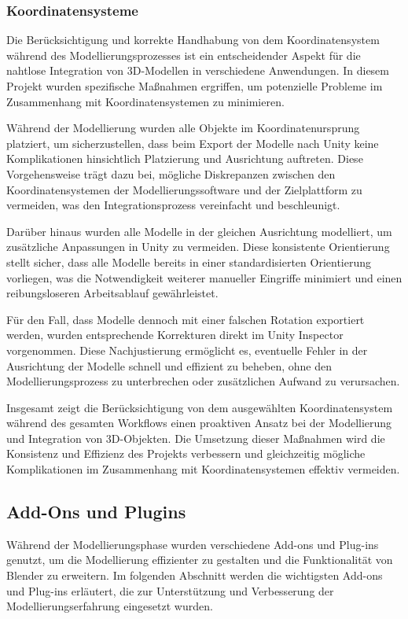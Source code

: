 \subsubsection{Koordinatensysteme}
Die Berücksichtigung und korrekte Handhabung von dem Koordinatensystem während des Modellierungsprozesses ist ein entscheidender Aspekt für die nahtlose Integration von 3D-Modellen in verschiedene Anwendungen. In diesem Projekt wurden spezifische Maßnahmen ergriffen, um potenzielle Probleme im Zusammenhang mit Koordinatensystemen zu minimieren.

Während der Modellierung wurden alle Objekte im Koordinatenursprung platziert, um sicherzustellen, dass beim Export der Modelle nach Unity keine Komplikationen hinsichtlich Platzierung und Ausrichtung auftreten. Diese Vorgehensweise trägt dazu bei, mögliche Diskrepanzen zwischen den Koordinatensystemen der Modellierungssoftware und der Zielplattform zu vermeiden, was den Integrationsprozess vereinfacht und beschleunigt.

Darüber hinaus wurden alle Modelle in der gleichen Ausrichtung modelliert, um zusätzliche Anpassungen in Unity zu vermeiden. Diese konsistente Orientierung stellt sicher, dass alle Modelle bereits in einer standardisierten Orientierung vorliegen, was die Notwendigkeit weiterer manueller Eingriffe minimiert und einen reibungsloseren Arbeitsablauf gewährleistet.

Für den Fall, dass Modelle dennoch mit einer falschen Rotation exportiert werden, wurden entsprechende Korrekturen direkt im Unity Inspector vorgenommen. Diese Nachjustierung ermöglicht es, eventuelle Fehler in der Ausrichtung der Modelle schnell und effizient zu beheben, ohne den Modellierungsprozess zu unterbrechen oder zusätzlichen Aufwand zu verursachen.

Insgesamt zeigt die Berücksichtigung von dem ausgewählten Koordinatensystem während des gesamten Workflows einen proaktiven Ansatz bei der Modellierung und Integration von 3D-Objekten. Die Umsetzung dieser Maßnahmen wird die Konsistenz und Effizienz des Projekts verbessern und gleichzeitig mögliche Komplikationen im Zusammenhang mit Koordinatensystemen effektiv vermeiden.

\subsection{Add-Ons und Plugins}
Während der Modellierungsphase wurden verschiedene Add-ons und Plug-ins genutzt, um die Modellierung effizienter zu gestalten und die Funktionalität von Blender zu erweitern.   Im folgenden Abschnitt werden die wichtigsten Add-ons und Plug-ins erläutert, die zur Unterstützung und Verbesserung der Modellierungserfahrung eingesetzt wurden.

